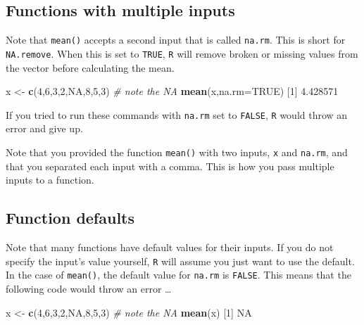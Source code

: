 \documentclass[
]{book}
\newenvironment{Shaded}{\begin{snugshade}}{\end{snugshade}}
\newcommand{\CommentTok}[1]{\textcolor[rgb]{0.56,0.35,0.01}{\textit{#1}}}
\newcommand{\DataTypeTok}[1]{\textcolor[rgb]{0.13,0.29,0.53}{#1}}
\newcommand{\DecValTok}[1]{\textcolor[rgb]{0.00,0.00,0.81}{#1}}
\newcommand{\FloatTok}[1]{\textcolor[rgb]{0.00,0.00,0.81}{#1}}
\newcommand{\KeywordTok}[1]{\textcolor[rgb]{0.13,0.29,0.53}{\textbf{#1}}}
\newcommand{\NormalTok}[1]{#1}
\newcommand{\OtherTok}[1]{\textcolor[rgb]{0.56,0.35,0.01}{#1}}
\newcommand{\StringTok}[1]{\textcolor[rgb]{0.31,0.60,0.02}{#1}}
\begin{document}
\hypertarget{functions-with-multiple-inputs}{%
\subsection*{Functions with multiple inputs}\label{functions-with-multiple-inputs}}

Note that \texttt{mean()} accepts a second input that is called \texttt{na.rm}. This is short for \texttt{NA.remove}. When this is set to \texttt{TRUE}, \texttt{R} will remove broken or missing values from the vector before calculating the mean.

\begin{Shaded}
\begin{Highlighting}[]
\NormalTok{x <-}\StringTok{ }\KeywordTok{c}\NormalTok{(}\DecValTok{4}\NormalTok{,}\DecValTok{6}\NormalTok{,}\DecValTok{3}\NormalTok{,}\DecValTok{2}\NormalTok{,}\OtherTok{NA}\NormalTok{,}\DecValTok{8}\NormalTok{,}\DecValTok{5}\NormalTok{,}\DecValTok{3}\NormalTok{)  }\CommentTok{# note the NA}
\KeywordTok{mean}\NormalTok{(x,}\DataTypeTok{na.rm=}\OtherTok{TRUE}\NormalTok{)}
\NormalTok{[}\DecValTok{1}\NormalTok{] }\FloatTok{4.428571}
\end{Highlighting}
\end{Shaded}

If you tried to run these commands with \texttt{na.rm} set to \texttt{FALSE}, \texttt{R} would throw an error and give up.

Note that you provided the function \texttt{mean()} with two inputs, \texttt{x} and \texttt{na.rm}, and that you separated each input with a comma. This is how you pass multiple inputs to a function.

\hypertarget{function-defaults}{%
\subsection*{Function defaults}\label{function-defaults}}

Note that many functions have default values for their inputs. If you do not specify the input's value yourself, \texttt{R} will assume you just want to use the default. In the case of \texttt{mean()}, the default value for \texttt{na.rm} is \texttt{FALSE}. This means that the following code would throw an error \ldots{}

\begin{Shaded}
\begin{Highlighting}[]
\NormalTok{x <-}\StringTok{ }\KeywordTok{c}\NormalTok{(}\DecValTok{4}\NormalTok{,}\DecValTok{6}\NormalTok{,}\DecValTok{3}\NormalTok{,}\DecValTok{2}\NormalTok{,}\OtherTok{NA}\NormalTok{,}\DecValTok{8}\NormalTok{,}\DecValTok{5}\NormalTok{,}\DecValTok{3}\NormalTok{)  }\CommentTok{# note the NA}
\KeywordTok{mean}\NormalTok{(x)}
\NormalTok{[}\DecValTok{1}\NormalTok{] }\OtherTok{NA}
\end{Highlighting}
\end{Shaded}
\end{document}
